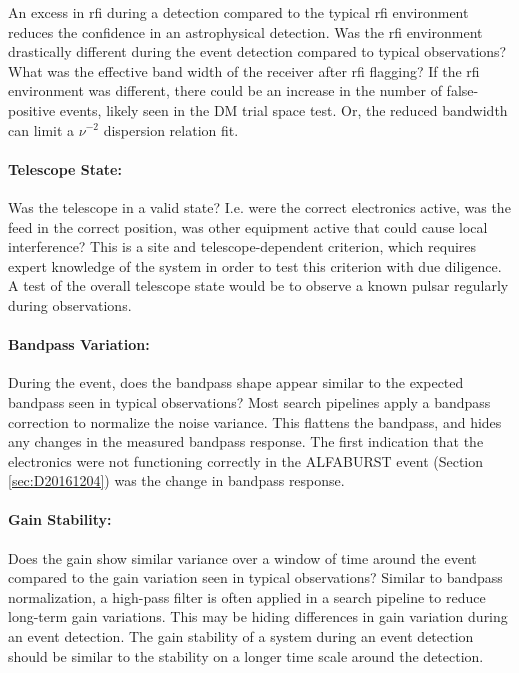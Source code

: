 \documentclass[a4paper,fleqn,usenatbib]{mnras}
\begin{document}
An excess in \gls{rfi} during a detection compared to the typical \gls{rfi}
environment reduces the confidence in an astrophysical detection.  Was the
\gls{rfi} environment drastically different during the event detection compared
to typical observations? What was the effective band width of the receiver after
\gls{rfi} flagging? If the \gls{rfi} environment was different, there could be
an increase in the number of false-positive events, likely seen in the DM trial
space test. Or, the reduced bandwidth can limit a $\nu^{-2}$ dispersion relation
fit.

\paragraph{Telescope State:}

Was the telescope in a valid state? I.e. were the correct electronics active,
was the feed in the correct position, was other equipment active that could
cause local interference? This is a site and telescope-dependent criterion,
which requires expert knowledge of the system in order to test this criterion
with due diligence.  A test of the overall telescope state would be to observe a
known pulsar regularly during observations.

\paragraph{Bandpass Variation:}

During the event, does the bandpass shape appear similar to the expected
bandpass seen in typical observations? Most search pipelines apply a bandpass
correction to normalize the noise variance. This flattens the bandpass, and
hides any changes in the measured bandpass response. The first indication that
the electronics were not functioning correctly in the ALFABURST event (Section
\ref{sec:D20161204}) was the change in bandpass response.

\paragraph{Gain Stability:}

Does the gain show similar variance over a window of time around the event
compared to the gain variation seen in typical observations? Similar to bandpass
normalization, a high-pass filter is often applied in a search pipeline to
reduce long-term gain variations. This may be hiding differences in gain
variation during an event detection. The gain stability of a system during an
event detection should be similar to the stability on a longer time scale around
the detection.
\end{document}
